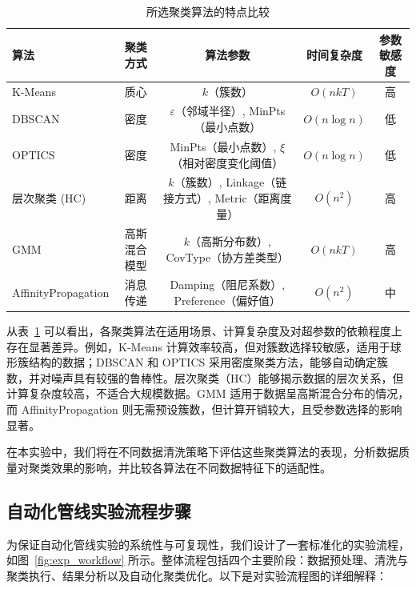 \documentclass[10pt]{article} %
\numberwithin{equation}{section}
\begin{document}
\begin{table}[htbp]
    \centering
    \small %
    \begin{tabular}{lcccc}
        \toprule
        \textbf{算法} & \textbf{聚类方式} & \textbf{算法参数} & \textbf{时间复杂度} & \textbf{参数敏感度} \\
        \midrule
        K-Means & 质心 & $k$（簇数） & $O(nkT)$ & 高 \\
        DBSCAN & 密度 & $\varepsilon$（邻域半径）, MinPts（最小点数） & $O(n \log n)$ & 低 \\
        OPTICS & 密度 & MinPts（最小点数）, $\xi$（相对密度变化阈值） & $O(n \log n)$ & 低 \\
        层次聚类 (HC) & 距离 & $k$（簇数）, Linkage（链接方式）, Metric（距离度量） & $O(n^2)$ & 高 \\
        GMM & 高斯混合模型 & $k$（高斯分布数）, CovType（协方差类型） & $O(nkT)$ & 高 \\
        AffinityPropagation & 消息传递 & Damping（阻尼系数）, Preference（偏好值） & $O(n^2)$ & 中 \\
        \bottomrule
    \end{tabular}
    \caption{所选聚类算法的特点比较}
    \label{tab:clustering_algorithms}
\end{table}

\noindent
从表~\ref{tab:clustering_algorithms} 可以看出，各聚类算法在适用场景、计算复杂度及对超参数的依赖程度上存在显著差异。例如，K-Means 计算效率较高，但对簇数选择较敏感，适用于球形簇结构的数据；DBSCAN 和 OPTICS 采用密度聚类方法，能够自动确定簇数，并对噪声具有较强的鲁棒性。层次聚类（HC）能够揭示数据的层次关系，但计算复杂度较高，不适合大规模数据。GMM 适用于数据呈高斯混合分布的情况，而 AffinityPropagation 则无需预设簇数，但计算开销较大，且受参数选择的影响显著。

在本实验中，我们将在不同数据清洗策略下评估这些聚类算法的表现，分析数据质量对聚类效果的影响，并比较各算法在不同数据特征下的适配性。

\vspace{1em}
\subsection{自动化管线实验流程步骤}
\label{sec:exp_flow}

为保证自动化管线实验的系统性与可复现性，我们设计了一套标准化的实验流程，如图~\ref{fig:exp_workflow} 所示。整体流程包括四个主要阶段：数据预处理、清洗与聚类执行、结果分析以及自动化聚类优化。以下是对实验流程图的详细解释：
\end{document}

